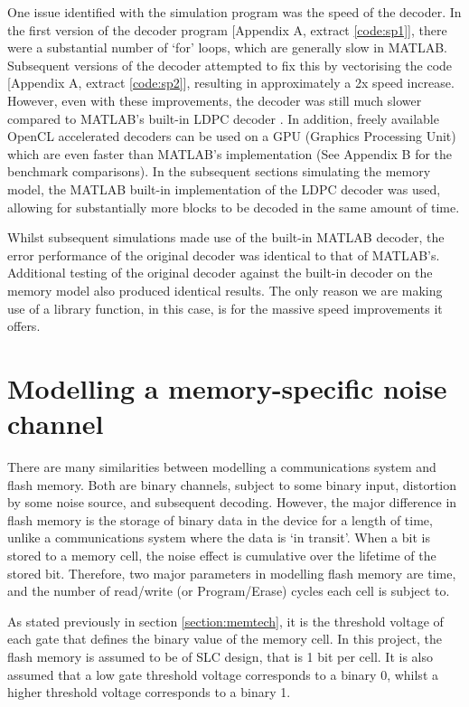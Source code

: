 \documentclass[11pt]{article}
\numberwithin{equation}{subsection}
\begin{document}
One issue identified with the simulation program was the speed of the decoder. In the first version of the decoder program [Appendix A, extract \ref{code:sp1}], there were a substantial number of `for' loops, which are generally slow in MATLAB. Subsequent versions of the decoder attempted to fix this by vectorising the code [Appendix A, extract \ref{code:sp2}], resulting in approximately a 2x speed increase. However, even with these improvements, the decoder was still much slower compared to MATLAB's built-in LDPC decoder \cite{matlab-ldpc}. In addition, freely available OpenCL accelerated decoders \cite{openCL} can be used on a GPU (Graphics Processing Unit) which are even faster than MATLAB's implementation (See Appendix B for the benchmark comparisons). In the subsequent sections simulating the memory model, the MATLAB built-in implementation of the LDPC decoder was used, allowing for substantially more blocks to be decoded in the same amount of time.

Whilst subsequent simulations made use of the built-in MATLAB decoder, the error performance of the original decoder was identical to that of MATLAB's. Additional testing of the original decoder against the built-in decoder on the memory model also produced identical results. The only reason we are making use of a library function, in this case, is for the massive speed improvements it offers.

\section{Modelling a memory-specific noise channel} \label{section:memory}
There are many similarities between modelling a communications system and flash memory. Both are binary channels, subject to some binary input, distortion by some noise source, and subsequent decoding. However, the major difference in flash memory is the storage of binary data in the device for a length of time, unlike a communications system where the data is `in transit'. When a bit is stored to a memory cell, the noise effect is cumulative over the lifetime of the stored bit. Therefore, two major parameters in modelling flash memory are time, and the number of read/write (or Program/Erase) cycles each cell is subject to.

As stated previously in section \ref{section:memtech}, it is the threshold voltage of each gate that defines the binary value of the memory cell. In this project, the flash memory is assumed to be of SLC design, that is 1 bit per cell. It is also assumed that a low gate threshold voltage corresponds to a binary 0, whilst a higher threshold voltage corresponds to a binary 1. 
\end{document}
